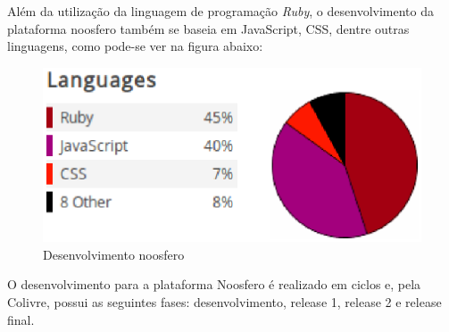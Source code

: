 Além da utilização da linguagem de programação \textit{Ruby}, o desenvolvimento da plataforma noosfero também se baseia em JavaScript, CSS, dentre outras linguagens, como pode-se ver na figura abaixo:
%
\begin{figure}[!h]
    \centering
    \includegraphics[keepaspectratio=true,scale=0.60]
      {figuras/noosfero.eps}
    \caption{Desenvolvimento noosfero}
    \label{noosfero}
\end{figure}

O desenvolvimento para a plataforma Noosfero é realizado em ciclos e, pela Colivre, 
possui as seguintes fases: desenvolvimento, release 1, release 2 e release final.

